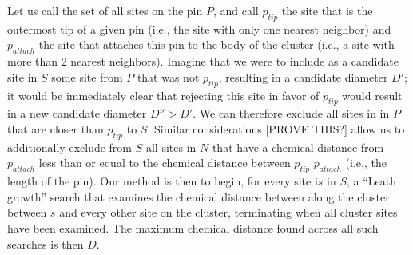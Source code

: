 \documentclass[pre,preprint,11pt]{revtex4}
\begin{document}


 Let us call the set of all sites on the pin $P$, and call $p_{tip}$ the site that is the outermost tip of a given pin (i.e., the site with only one nearest neighbor) and $p_{attach}$ the site that attaches this pin to the body of the cluster (i.e., a site with more than 2 nearest neighbors).  Imagine that we were to include as a candidate site in $S$ some site from $P$ that was not $p_{tip}$, resulting in a candidate diameter $D'$; it would be immediately clear that rejecting this site in favor of $p_{tip}$ would result in a new candidate diameter $D''>D'$.  We can therefore exclude all sites in in $P$ that are closer than $p_{tip}$ to $S$.  Similar considerations [PROVE THIS?] allow us to additionally exclude from $S$ all sites in $N$ that have a chemical distance from $p_{attach}$ less than or equal to the chemical distance between $p_{tip}$ $p_{attach}$ (i.e., the length of the pin). Our method is then to begin, for every site i$s$ in $S$, a ``Leath growth'' search that examines the chemical distance between along the cluster between $s$ and every other site on the cluster, terminating when all cluster sites have been examined.  The maximum chemical distance found across all such searches is then $D$.   

\end{document}

